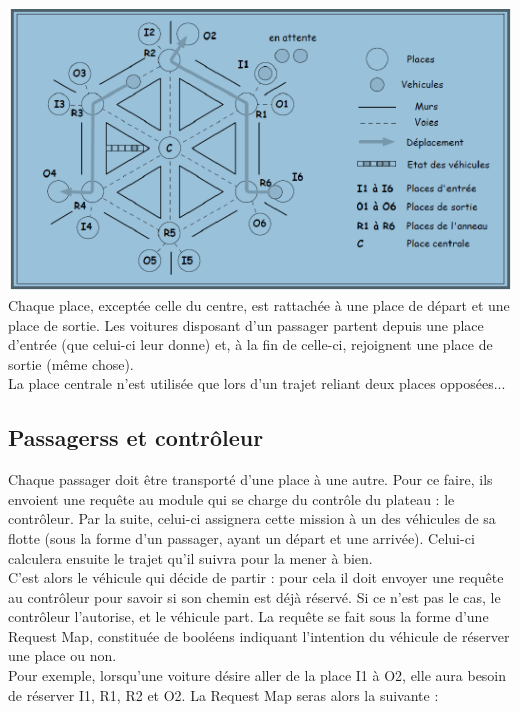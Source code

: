 \documentclass[a4paper, titlepage]{report}
\begin{document}
\includegraphics[]{Images/Plateau}
\vspace{0.5cm}
\\
Chaque place, exceptée celle du centre, est rattachée à une place de départ et une place de sortie. Les voitures disposant d'un passager partent depuis une place d'entrée (que celui-ci leur donne) et, à la fin de celle-ci, rejoignent une place de sortie (même chose).\\
La place centrale n'est utilisée que lors d'un trajet reliant deux places opposées...
\subsection{Passagerss et contrôleur}
Chaque passager doit être transporté d'une place à une autre. Pour ce faire, ils envoient une requête au module qui se charge du contrôle du plateau : le contrôleur. Par la suite, celui-ci assignera cette mission à un des véhicules de sa flotte (sous la forme d'un passager, ayant un départ et une arrivée). Celui-ci calculera ensuite le trajet qu'il suivra pour la mener à bien.\\
C'est alors le véhicule qui décide de partir : pour cela il doit envoyer une requête au contrôleur pour savoir si son chemin est déjà réservé. Si ce n'est pas le cas, le contrôleur l'autorise, et le véhicule part. La requête se fait sous la forme d'une Request Map, constituée de booléens indiquant l'intention du véhicule de réserver une place ou non.\\
Pour exemple, lorsqu'une voiture désire aller de la place I1 à O2, elle aura besoin de réserver I1, R1, R2 et O2. La Request Map seras alors la suivante :
\vspace{0.5cm}
\end{document}
